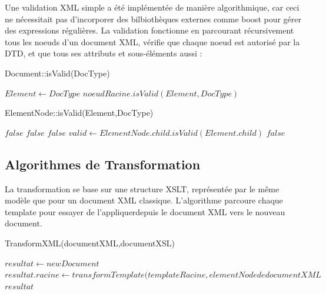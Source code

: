 Une validation XML simple a été implémentée de manière algorithmique, car ceci ne nécessitait pas d'incorporer des bilbiothèques externes comme boost pour gérer des expressions régulières. La validation fonctionne en parcourant récursivement tous les noeuds d'un document XML, vérifie que chaque noeud est autorisé par la DTD, et que tous ses attributs et sous-éléments aussi :

\begin{algorithm}
\caption{Document::isValid(DocType)}
\begin{algorithmic}
\STATE $Element \leftarrow DocType$
\RETURN $noeudRacine.isValid(Element,DocType)$
\end{algorithmic}
\end{algorithm}

\begin{algorithm}
\caption{ElementNode::isValid(Element,DocType)}
\begin{algorithmic}
\RETURN $false$
\ENDIF
{}
\RETURN $false$
\ENDIF
\ENDFOR
{}
\RETURN $false$
\ENDIF
\STATE $valid \leftarrow ElementNode.child.isValid(Element.child)$
\RETURN $false$
\ENDIF
\ENDFOR
\end{algorithmic}
\end{algorithm}

\subsection{Algorithmes de Transformation}

La transformation se base sur une structure XSLT, représentée par le même modèle que pour un document XML classique. L'algorithme parcoure chaque template pour essayer de l'appliquerdepuis le document XML vers le nouveau document.

\begin{algorithm}
\caption{TransformXML(documentXML,documentXSL)}
\begin{algorithmic}
\STATE $resultat \leftarrow new Document$
\STATE $resultat.racine \leftarrow transformTemplate(templateRacine,elementNode de documentXML$
\ENDIF
\ENDFOR
\RETURN $resultat$
\end{algorithmic}
\end{algorithm}

